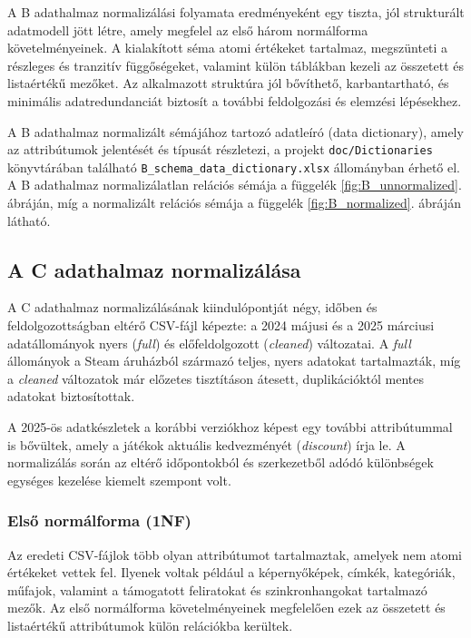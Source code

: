 A B adathalmaz normalizálási folyamata eredményeként egy tiszta, jól strukturált adatmodell jött létre, amely megfelel az első három normálforma követelményeinek. A kialakított séma atomi értékeket tartalmaz, megszünteti a részleges és tranzitív függőségeket, valamint külön táblákban kezeli az összetett és listaértékű mezőket. Az alkalmazott struktúra jól bővíthető, karbantartható, és minimális adatredundanciát biztosít a további feldolgozási és elemzési lépésekhez.

A B adathalmaz normalizált sémájához tartozó adatleíró (data dictionary),
amely az attribútumok jelentését és típusát részletezi, a projekt
\texttt{doc/Dictionaries} könyvtárában található
\texttt{B\_schema\_data\_dictionary.xlsx} állományban érhető el. A B
adathalmaz normalizálatlan relációs sémája a függelék
\ref{fig:B_unnormalized}. ábráján, míg a normalizált relációs sémája a
függelék \ref{fig:B_normalized}. ábráján látható.

\subsection{A C adathalmaz normalizálása}

A C \cite{c} adathalmaz normalizálásának kiindulópontját négy, időben és feldolgozottságban eltérő CSV-fájl képezte: a 2024 májusi és a 2025 márciusi adatállományok nyers (\textit{full}) és előfeldolgozott (\textit{cleaned}) változatai. A \textit{full} állományok a Steam \cite{steam} áruházból származó teljes, nyers adatokat tartalmazták, míg a \textit{cleaned} változatok már előzetes tisztításon átesett, duplikációktól mentes adatokat biztosítottak.

A 2025-ös adatkészletek a korábbi verziókhoz képest egy további attribútummal is bővültek, amely a játékok aktuális kedvezményét (\textit{discount}) írja le. A normalizálás során az eltérő időpontokból és szerkezetből adódó különbségek egységes kezelése kiemelt szempont volt.

\subsubsection{Első normálforma (1NF)}

Az eredeti CSV-fájlok több olyan attribútumot tartalmaztak, amelyek nem atomi értékeket vettek fel. Ilyenek voltak például a képernyőképek, címkék, kategóriák, műfajok, valamint a támogatott feliratokat és szinkronhangokat tartalmazó mezők. Az első normálforma követelményeinek megfelelően ezek az összetett és listaértékű attribútumok külön relációkba kerültek.

